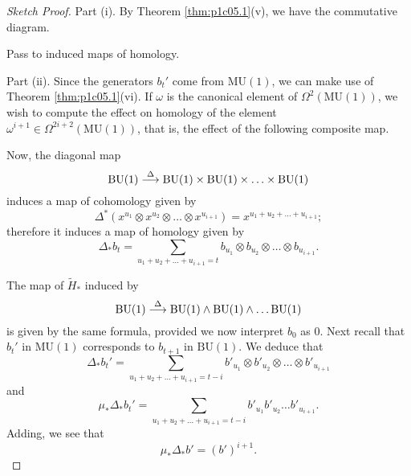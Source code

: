 \documentclass[../main]{subfiles}
\begin{document}
\begin{proof}[Sketch Proof]
Part (i). By Theorem \ref{thm:p1c05.1}(v), we have the commutative diagram. 

\begin{center}
\end{center}

Pass to induced maps of homology.

Part (ii). Since the generators $b_t'$ come from $\mathrm{MU}(1)$, we can make use of Theorem \ref{thm:p1c05.1}(vi). If $\omega$ is the canonical element of $\Omega^2(\mathrm{MU}(1))$, we wish to compute the effect on homology of the element $\omega^{i + 1} \in \Omega^{2i + 2} (\mathrm{MU}(1))$, that is, the effect of the following composite map.

\begin{center}
\end{center} 

Now, the diagonal map $$\mathrm{BU}(1) \overset{\Delta}{\longrightarrow} \mathrm{BU}(1) \times \mathrm{BU}(1) \times \ldots \times \mathrm{BU}(1)$$ induces a map of cohomology given by $$\Delta^\ast (x^{u_1} \otimes x^{u_2} \otimes \ldots \otimes x^{u_{i + 1}}) = x^{u_1 + u_2 + \ldots + u_{i + 1}};$$ therefore it induces a map of homology given by $$\Delta_\ast b_t = \sum_{u_1 + u_2 + \ldots + u_{i + 1} = t} b_{u_1} \otimes b_{u_2} \otimes \ldots \otimes b_{u_{i + 1}}.$$

The map of ${\tilde H}_\ast$ induced by $$\mathrm{BU}(1) \overset{\Delta}{\longrightarrow} \mathrm{BU}(1) \wedge \mathrm{BU}(1) \wedge \ldots \mathrm{BU}(1)$$ is given by the same formula, provided we now interpret $b_0$ as $0$. Next recall that $b_t'$ in $\mathrm{MU}(1)$ corresponds to $b_{t + 1}$ in $\mathrm{BU}(1)$. We deduce that $$\Delta_\ast b_t' = \sum_{u_1 + u_2 + \ldots + u_{i + 1} = t - i} b'_{u_1} \otimes b'_{u_2} \otimes \ldots \otimes b'_{u_{i + 1}}$$ and $$\mu_\ast \Delta_\ast b_t' = \sum_{u_1 + u_2 + \ldots + u_{i + 1} = t - i} b'_{u_1} b'_{u_2} \ldots b'_{u_{i + 1}}.$$ Adding, we see that $$\mu_\ast \Delta_\ast b' = (b')^{i + 1}.$$


\end{proof}
\end{document}
